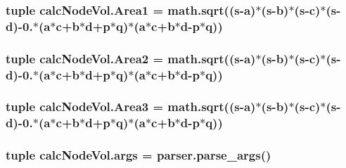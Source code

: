 \subsubsection[{Area1}]{\setlength{\rightskip}{0pt plus 5cm}tuple calc\+Node\+Vol.\+Area1 = math.\+sqrt(({\bf s}-\/{\bf a})$\ast$({\bf s}-\/{\bf b})$\ast$({\bf s}-\/{\bf c})$\ast$({\bf s}-\/{\bf d})-\/0.$\ast$({\bf a}$\ast${\bf c}+{\bf b}$\ast${\bf d}+{\bf p}$\ast${\bf q})$\ast$({\bf a}$\ast${\bf c}+{\bf b}$\ast${\bf d}-\/{\bf p}$\ast${\bf q}))}\label{namespacecalcNodeVol_a74779eeef564a15fb3ed52c2a1d27c1b}
\hypertarget{namespacecalcNodeVol_ac1fe4daeb0889461d58a7c685d77d1c8}{}
\subsubsection[{Area2}]{\setlength{\rightskip}{0pt plus 5cm}tuple calc\+Node\+Vol.\+Area2 = math.\+sqrt(({\bf s}-\/{\bf a})$\ast$({\bf s}-\/{\bf b})$\ast$({\bf s}-\/{\bf c})$\ast$({\bf s}-\/{\bf d})-\/0.$\ast$({\bf a}$\ast${\bf c}+{\bf b}$\ast${\bf d}+{\bf p}$\ast${\bf q})$\ast$({\bf a}$\ast${\bf c}+{\bf b}$\ast${\bf d}-\/{\bf p}$\ast${\bf q}))}\label{namespacecalcNodeVol_ac1fe4daeb0889461d58a7c685d77d1c8}
\hypertarget{namespacecalcNodeVol_a33ae3be99f4fe9a2182928593ed0a74c}{}
\subsubsection[{Area3}]{\setlength{\rightskip}{0pt plus 5cm}tuple calc\+Node\+Vol.\+Area3 = math.\+sqrt(({\bf s}-\/{\bf a})$\ast$({\bf s}-\/{\bf b})$\ast$({\bf s}-\/{\bf c})$\ast$({\bf s}-\/{\bf d})-\/0.$\ast$({\bf a}$\ast${\bf c}+{\bf b}$\ast${\bf d}+{\bf p}$\ast${\bf q})$\ast$({\bf a}$\ast${\bf c}+{\bf b}$\ast${\bf d}-\/{\bf p}$\ast${\bf q}))}\label{namespacecalcNodeVol_a33ae3be99f4fe9a2182928593ed0a74c}
\hypertarget{namespacecalcNodeVol_ad8e8c17c49f462bf19254dd620483ca4}{}
\subsubsection[{args}]{\setlength{\rightskip}{0pt plus 5cm}tuple calc\+Node\+Vol.\+args = parser.\+parse\+\_\+args()}\label{namespacecalcNodeVol_ad8e8c17c49f462bf19254dd620483ca4}
\hypertarget{namespacecalcNodeVol_a80842dbecc8a3378b52f03512ae1be5e}{}

